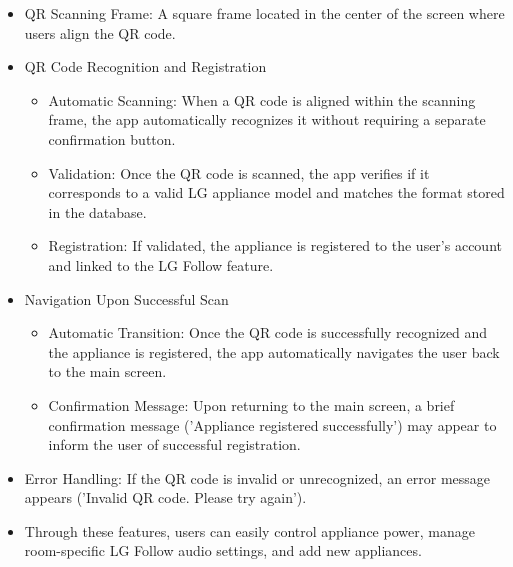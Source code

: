 \documentclass[conference]{IEEEtran}
\begin{document}
\begin{itemize}
    \item QR Scanning Frame: A square frame located in the center of the screen where users align the QR code.\\
    \item QR Code Recognition and Registration
\begin{itemize}
    \item Automatic Scanning: When a QR code is aligned within the scanning frame, the app automatically recognizes it without requiring a separate confirmation button.\\
    \item Validation: Once the QR code is scanned, the app verifies if it corresponds to a valid LG appliance model and matches the format stored in the database.\\
    \item Registration: If validated, the appliance is registered to the user’s account and linked to the LG Follow feature.\\
\end{itemize}
\end{itemize}
\begin{itemize}
    \item Navigation Upon Successful Scan
\begin{itemize}
    \item Automatic Transition: Once the QR code is successfully recognized and the appliance is registered, the app automatically navigates the user back to the main screen.\\
    \item Confirmation Message: Upon returning to the main screen, a brief confirmation message ('Appliance registered successfully') may appear to inform the user of successful registration.\\
\end{itemize}
\end{itemize}
\begin{itemize}
    \item Error Handling: If the QR code is invalid or unrecognized, an error message appears ('Invalid QR code. Please try again').\\
    \item     Through these features, users can easily control appliance power, manage room-specific LG Follow audio settings, and add new appliances.\\
\end{itemize}
\end{document}
